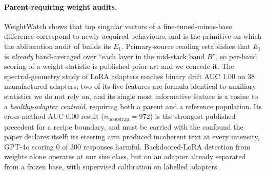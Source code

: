 \documentclass[11pt,letterpaper]{article}
\begin{document}
\paragraph{Parent-requiring weight audits.} WeightWatch \citep{Zhong2025} shows that top singular vectors of a fine-tuned-minus-base difference correspond to newly acquired behaviours, and is the primitive on which the abliteration audit of \citet{Hurtado2026} builds its $E_1$. Primary-source reading establishes that $E_1$ is \emph{already} band-averaged over ``each layer in the mid-stack band $B$'', so per-band scoring of a weight statistic is published prior art and we concede it. The spectral-geometry study of LoRA adapters \citep{Paul2026} reaches binary drift AUC 1.00 on 38 manufactured adapters; two of its five features are formula-identical to auxiliary statistics we do not rely on, and its single most informative feature is a cosine to a \emph{healthy-adapter centroid}, requiring both a parent and a reference population. Its cross-method AUC 0.00 result ($n_{\text{bootstrap}} = 972$) is the strongest published precedent for a recipe boundary, and must be carried with the confound the paper declares itself: its steering arm produced incoherent text at every intensity, GPT-4o scoring 0 of 300 responses harmful. Backdoored-LoRA detection from weights alone \citep{BackdooredLoRA2026} operates at our size class, but on an adapter already separated from a frozen base, with supervised calibration on labelled adapters.
\end{document}
